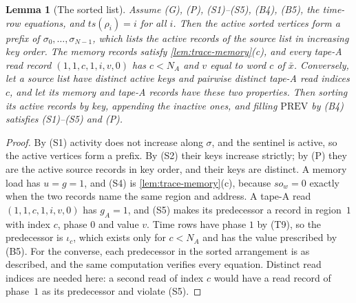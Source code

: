 \documentclass[11pt,letterpaper]{article}
\newtheorem{lemma}[theorem]{Lemma}
\theoremstyle{definition}
\theoremstyle{remark}
\begin{document}
\begin{lemma}[The sorted list]\label{lem:trace-sorted}
Assume (G), (P), (S1)--(S5), (B4), (B5), the time-row equations, and
\(\mathit{ts}(\rho_i)=i\) for all \(i\). Then the active sorted vertices
form a prefix of \(\sigma_0,\ldots,\sigma_{N-1}\), which lists the active
records of the source list in increasing key order. The memory records
satisfy \cref{lem:trace-memory}(c), and every tape-A read record
\((1,1,c,1,i,v,0)\) has \(c<N_A\) and \(v\) equal to word \(c\) of
\(\bar x\). Conversely, let a source list have distinct active keys and
pairwise distinct tape-A read indices \(c\), and let its memory and
tape-A records have these two properties. Then sorting its active
records by key, appending the inactive ones, and filling
\(\mathrm{PREV}\) by (B4) satisfies (S1)--(S5) and (P).
\end{lemma}
\begin{proof}
By (S1) activity does not increase along \(\sigma\), and the sentinel is
active, so the active vertices form a prefix. By (S2) their keys
increase strictly; by (P) they are the active source records in key
order, and their keys are distinct. A memory load has \(u=g=1\), and
(S4) is \cref{lem:trace-memory}(c), because \(\mathit{so}_w=0\) exactly
when the two records name the same region and address. A tape-A read
\((1,1,c,1,i,v,0)\) has \(g_A=1\), and (S5) makes its predecessor a
record in region~\(1\) with index \(c\), phase \(0\) and value \(v\).
Time rows have phase \(1\) by (T9), so the predecessor is \(\iota_c\),
which exists only for \(c<N_A\) and has the value prescribed by (B5).
For the converse, each predecessor in the sorted arrangement is as
described, and the same computation verifies every equation. Distinct
read indices are needed here: a second read of index \(c\) would have
a read record of phase~\(1\) as its predecessor and violate (S5).
\end{proof}
\end{document}
